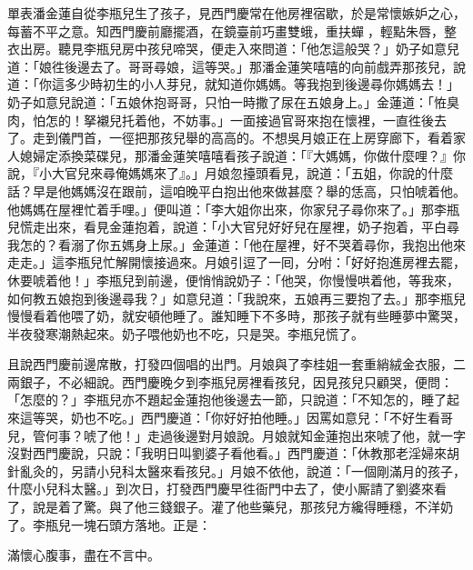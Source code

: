 單表潘金蓮自從李瓶兒生了孩子，見西門慶常在他房裡宿歇，於是常懷嫉妒之心，每蓄不平之意。知西門慶前廳擺酒，在鏡臺前巧畫雙蛾，重扶蟬𩬆，輕點朱唇，整衣出房。聽見李瓶兒房中孩兒啼哭，便走入來問道：「他怎這般哭？」奶子如意兒道：「娘徃後邊去了。哥哥尋娘，這等哭。」那潘金蓮笑嘻嘻的向前戲弄那孩兒，說道：「你這多少時初生的小人芽兒，就知道你媽媽。等我抱到後邊尋你媽媽去！」奶子如意兒說道：「五娘休抱哥哥，只怕一時撒了尿在五娘身上。」金蓮道：「恠臭肉，怕怎的！拏襯兒托着他，不妨事。」一面接過官哥來抱在懷裡，一直徃後去了。走到儀門首，一徑把那孩兒舉的高高的。不想吳月娘正在上房穿廊下，看着家人媳婦定添換菜碟兒，那潘金蓮笑嘻嘻看孩子說道：「『大媽媽，你做什麼哩？』你說，『小大官兒來尋俺媽媽來了』。」{}月娘忽擡頭看見，說道：「五姐，你說的什麼話？早是他媽媽沒在跟前，這咱晚平白抱出他來做甚麼？舉的恁高，只怕唬着他。他媽媽在屋裡忙着手哩。」便叫道：「李大姐你出來，你家兒子尋你來了。」那李瓶兒慌走出來，看見金蓮抱着，說道：「小大官兒好好兒在屋裡，奶子抱着，平白尋我怎的？看溺了你五媽身上尿。」金蓮道：「他在屋裡，好不哭着尋你，我抱出他來走走。」這李瓶兒忙解開懷接過來。月娘引逗了一囘，分咐：「好好抱進房裡去罷，休要唬着他！」李瓶兒到前邊，便悄悄說奶子：「他哭，你慢慢哄着他，等我來，如何教五娘抱到後邊尋我？」如意兒道：「我說來，五娘再三要抱了去。」那李瓶兒慢慢看着他喂了奶，就安頓他睡了。誰知睡下不多時，那孩子就有些睡夢中驚哭，半夜發寒潮熱起來。奶子喂他奶也不吃，只是哭。李瓶兒慌了。

且說西門慶前邊席散，打發四個唱的出門。月娘與了李桂姐一套重綃絨金衣服，二兩銀子，不必細說。西門慶晚夕到李瓶兒房裡看孩兒，因見孩兒只顧哭，便問：「怎麼的？」李瓶兒亦不題起金蓮抱他後邊去一節，只說道：「不知怎的，睡了起來這等哭，奶也不吃。」西門慶道：「你好好拍他睡。」因罵如意兒：「不好生看哥兒，管何事？唬了他！」走過後邊對月娘說。月娘就知金蓮抱出來唬了他，就一字沒對西門慶說，只說：「我明日叫劉婆子看他看。」西門慶道：「休教那老淫婦來胡針亂灸的，另請小兒科太醫來看孩兒。」月娘不依他，說道：「一個剛滿月的孩子，什麼小兒科太醫。」到次日，打發西門慶早徃衙門中去了，使小厮請了劉婆來看了，說是着了驚。與了他三錢銀子。灌了他些藥兒，那孩兒方纔得睡穩，不洋奶了。李瓶兒一塊石頭方落地。正是：

\begin{myquote}
滿懷心腹事，盡在不言中。
\end{myquote}


